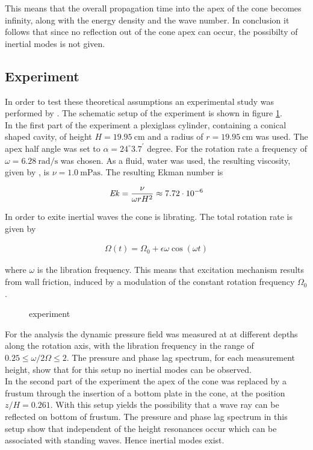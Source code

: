This means that the overall propagation time into the apex of the cone becomes infinity, along with the energy density and the wave number.
In conclusion it follows that since no reflection out of the cone apex can occur, the possibilty of inertial modes is not given.\\

\subsection{Experiment}

In order to test these theoretical assumptions  an experimental study was performed by \citep{Beardsley1970}.
The schematic setup of the experiment is shown in figure \ref{cone:setup_experiment}.\\
In the first part of the experiment a plexiglass cylinder, containing a conical shaped cavity,
of height $H=\SI{19.95}{\centi\meter}$ and a radius of $r=\SI{19.95}{\centi\meter}$ was used.
The apex half angle was set to $\alpha=24^{\circ}3.7^{\prime}$ degree.
For the rotation rate a frequency of $\omega =\SI{6.28}{\radian\per\second}$ was chosen.
As a fluid, water was used, the resulting viscosity, given by \citep{tipler2003}, is $\nu = \SI{1.0}{\milli\pascal\second}$.
The resulting Ekman number is

\begin{align}
    \mbox{\textit{Ek}} = \frac{\nu}{\omega r H^2} \approx 7.72\cdot 10^{-6}
\end{align}

In order to exite inertial waves the cone is librating.
The total rotation rate is given by

\begin{align}
\Omega(t) = \Omega_0 + \epsilon \omega \cos(\omega t)
\end{align}

where $\omega$ is the libration frequency.
This means that excitation mechanism results from wall friction, induced
by a modulation of the constant rotation frequency $\Omega_0$.

\begin{figure}[!bt]
      \centering
      \caption{
      experiment
      \label{cone:setup_experiment}
      }
\end{figure}

For the analysis the dynamic pressure field was measured at at different depths along the rotation axis,
with the libration frequency in the range of $0.25\leq\omega/2\Omega\leq2$.
The pressure and phase lag spectrum, for each measurement height, show that for this setup
no inertial modes can be observed.\\
In the second part of the experiment the apex of the cone was replaced by a frustum through the
insertion of a bottom plate in the cone, at the position $z/H = 0.261$.
With this setup yields the possibility that a wave ray can be reflected on bottom of frustum.
The pressure and phase lag spectrum in this setup show that
independent of the height resonances occur which can be associated with standing waves.
Hence inertial modes exist.


